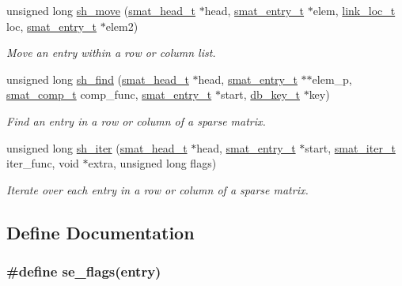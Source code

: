 \begin{CompactItemize}
unsigned long \hyperlink{group__dbprim__smat_a18}{sh\_\-move} (\hyperlink{group__dbprim__smat_a1}{smat\_\-head\_\-t} $\ast$head, \hyperlink{group__dbprim__smat_a2}{smat\_\-entry\_\-t} $\ast$elem, \hyperlink{group__dbprim__link_a4}{link\_\-loc\_\-t} loc, \hyperlink{group__dbprim__smat_a2}{smat\_\-entry\_\-t} $\ast$elem2)
\begin{CompactList}\small\item\em Move an entry within a row or column list.\item\end{CompactList}\item 
unsigned long \hyperlink{group__dbprim__smat_a19}{sh\_\-find} (\hyperlink{group__dbprim__smat_a1}{smat\_\-head\_\-t} $\ast$head, \hyperlink{group__dbprim__smat_a2}{smat\_\-entry\_\-t} $\ast$$\ast$elem\_\-p, \hyperlink{group__dbprim__smat_a5}{smat\_\-comp\_\-t} comp\_\-func, \hyperlink{group__dbprim__smat_a2}{smat\_\-entry\_\-t} $\ast$start, \hyperlink{group__dbprim_a0}{db\_\-key\_\-t} $\ast$key)
\begin{CompactList}\small\item\em Find an entry in a row or column of a sparse matrix.\item\end{CompactList}\item 
unsigned long \hyperlink{group__dbprim__smat_a20}{sh\_\-iter} (\hyperlink{group__dbprim__smat_a1}{smat\_\-head\_\-t} $\ast$head, \hyperlink{group__dbprim__smat_a2}{smat\_\-entry\_\-t} $\ast$start, \hyperlink{group__dbprim__smat_a4}{smat\_\-iter\_\-t} iter\_\-func, void $\ast$extra, unsigned long flags)
\begin{CompactList}\small\item\em Iterate over each entry in a row or column of a sparse matrix.\item\end{CompactList}\end{CompactItemize}


\subsection{Define Documentation}
\hypertarget{group__dbprim__smat_a42}{
\subsubsection[se\_\-flags]{\setlength{\rightskip}{0pt plus 5cm}\#define se\_\-flags(entry)}}
\label{group__dbprim__smat_a42}


